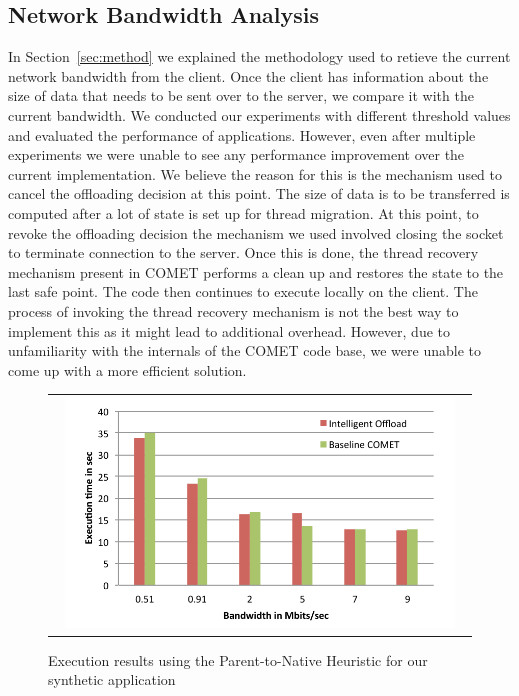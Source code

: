 \subsection{Network Bandwidth Analysis}
In Section~\ref{sec:method} we explained the methodology used to retieve the current network bandwidth from the client. Once the client has information
about the size of data that needs to be sent over to the server, we compare it with the current bandwidth. We conducted our experiments with
different threshold values and evaluated the performance of applications. However, even after multiple experiments we were unable to see any
performance improvement over the current implementation. We believe the reason for this is the mechanism used to cancel the offloading decision at this point.
The size of data is to be transferred is computed after a lot of state is set up for thread migration. At this point, to revoke the
offloading decision the mechanism we used involved closing the socket to terminate connection to the server. Once this is done, the thread recovery mechanism
present in COMET performs a clean up and restores the state to the last safe point. The code then continues to execute locally on the client. The process
of invoking the thread recovery mechanism is not the best way to implement this as it might lead to additional overhead. However, due to
unfamiliarity with the internals of the COMET code base, we were unable to come up with a more efficient solution.


\begin{figure} [thf*]
\centering
\begin{tabular}{c}
\begin{minipage}[b]{0.5\textwidth}
\includegraphics[width=0.95\textwidth]{figs/h1_sweep.pdf}
\end{minipage}
\end{tabular}
\caption{Execution results using the Parent-to-Native Heuristic for our synthetic application}
\label{fig:h1_sweep}
\end{figure}


